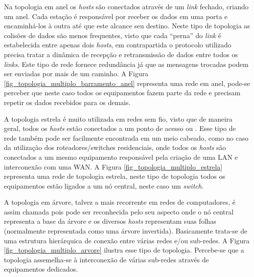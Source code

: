Na topologia em anel os \emph{hosts} são conectados através de um \emph{link} fechado, criando um anel. Cada estação é responsável por receber os dados em uma porta e encaminhá-los à outra até que este alcance seu destino. Neste tipo de topologia as colisões de dados são menos frequentes, visto que cada ``perna'' do \emph{link} é estabelecida entre apenas dois \emph{hosts}, em contrapartida o protocolo utilizado precisa tratar a dinâmica de recepção e retransmissão de dados entre todos os \emph{links}. Este tipo de rede fornece redundância já que as mensagens trocadas podem ser enviadas por mais de um caminho. A Figura \ref{fig_topologia_multiplo_barramento_anel} representa uma rede em anel, pode-se perceber que neste caso todos os equipamentos fazem parte da rede e precisam repetir os dados recebidos para os demais.


A topologia estrela é muito utilizada em redes sem fio, visto que de maneira geral, todos os \emph{hosts} estão conectados a um ponto de acesso ou . Esse tipo de rede também pode ser facilmente encontrada em um meio cabeado, como no caso da utilização dos roteadores/switches residenciais, onde todos os \emph{hosts} são conectados a um mesmo equipamento responsável pela criação de uma LAN e interconexão com uma WAN. A Figura \ref{fig_topologia_multiplo_estrela} representa uma rede de topologia estrela, neste tipo de topologia todos os equipamentos estão ligados a um nó central, neste caso um \emph{switch}.


A topologia em árvore, talvez a mais recorrente em redes de computadores, é assim chamada pois pode ser reconhecida pelo seu aspecto onde o nó central representa a base da árvore e os diversos \emph{hosts} representam suas folhas (normalmente representada como uma árvore invertida). Basicamente trata-se de uma estrutura hierárquica de conexão entre várias redes e/ou sub-redes. A Figura \ref{fig_topologia_multiplo_arvore} ilustra esse tipo de topologia. Percebe-se que a topologia assemelha-se à interconexão de várias sub-redes através de equipamentos dedicados.

